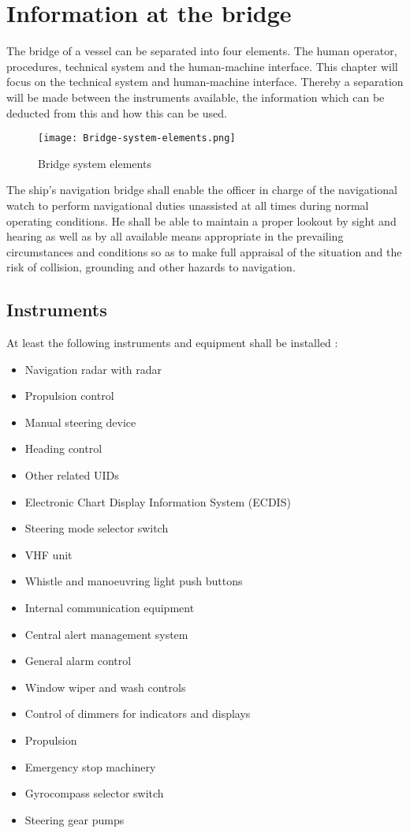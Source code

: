 \chapter{Information at the bridge}
The bridge of a vessel can be separated into four elements. The human operator, procedures,
technical system and the human-machine interface. This chapter will focus on the technical system and human-machine interface. Thereby a separation will be made between the instruments available, the information which can be deducted from this and how this can be used. 

\begin{figure}[H]
	\centering
	\texttt{[image: Bridge-system-elements.png]}
	\caption{Bridge system elements}
	\label{fig:Bridge-system-elements}
\end{figure}

The ship’s navigation bridge shall enable the officer in charge of the navigational watch to perform navigational duties unassisted at all times during normal operating conditions. He shall be able to maintain a proper lookout by sight and hearing as well as by all available means appropriate in the prevailing circumstances and conditions so as to make full appraisal of the situation and the risk of collision, grounding and other hazards to navigation.

\section{Instruments}
At least the following instruments and equipment shall be installed \cite{DNVGL2011}: 
\begin{multicols}{2}
	\begin{itemize}
		\item Navigation radar with radar
		\item Propulsion control
		\item Manual steering device
		\item Heading control
		\item Other related \ac{UID}s
		\item Electronic Chart Display Information System (ECDIS)
		\item Steering mode selector switch
		\item VHF unit
		\item Whistle and manoeuvring light push buttons
		\item Internal communication equipment
		\item Central alert management system
		\item General alarm control
		\item Window wiper and wash controls
		\item Control of dimmers for indicators and displays
		\item Propulsion
		\item Emergency stop machinery
		\item Gyrocompass selector switch
		\item Steering gear pumps
	\end{itemize}
\end{multicols}



